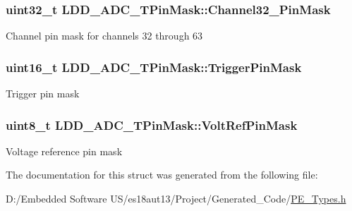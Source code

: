 \subsubsection[{Channel32\+\_\+63\+Pin\+Mask}]{\setlength{\rightskip}{0pt plus 5cm}uint32\+\_\+t L\+D\+D\+\_\+\+A\+D\+C\+\_\+\+T\+Pin\+Mask\+::\+Channel32\+\_\+Pin\+Mask}\label{struct_l_d_d___a_d_c___t_pin_mask_acd6bf6f512fb6e8cd170188dc663a4d8}
Channel pin mask for channels 32 through 63 \hypertarget{struct_l_d_d___a_d_c___t_pin_mask_a004a4d3a4f4071684e6676f64322215f}{}
\subsubsection[{Trigger\+Pin\+Mask}]{\setlength{\rightskip}{0pt plus 5cm}uint16\+\_\+t L\+D\+D\+\_\+\+A\+D\+C\+\_\+\+T\+Pin\+Mask\+::\+Trigger\+Pin\+Mask}\label{struct_l_d_d___a_d_c___t_pin_mask_a004a4d3a4f4071684e6676f64322215f}
Trigger pin mask \hypertarget{struct_l_d_d___a_d_c___t_pin_mask_a556430a91304e7db634bda25091b892c}{}
\subsubsection[{Volt\+Ref\+Pin\+Mask}]{\setlength{\rightskip}{0pt plus 5cm}uint8\+\_\+t L\+D\+D\+\_\+\+A\+D\+C\+\_\+\+T\+Pin\+Mask\+::\+Volt\+Ref\+Pin\+Mask}\label{struct_l_d_d___a_d_c___t_pin_mask_a556430a91304e7db634bda25091b892c}
Voltage reference pin mask 

The documentation for this struct was generated from the following file\+:\begin{DoxyCompactItemize}
\item 
D\+:/\+Embedded Software U\+S/es18aut13/\+Project/\+Generated\+\_\+\+Code/\hyperlink{_p_e___types_8h}{P\+E\+\_\+\+Types.\+h}\end{DoxyCompactItemize}
